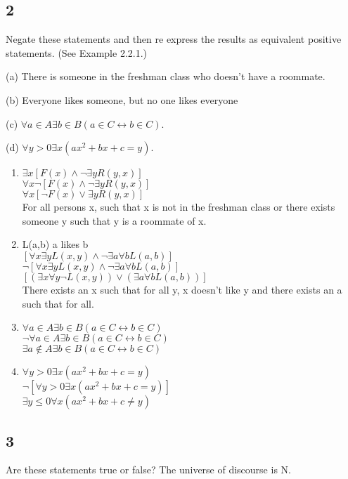 \documentclass{article}
\begin{document}
\subsection{2}
Negate these statements and then re express the results as equivalent
positive statements. (See Example 2.2.1.)

(a) There is someone in the freshman class who doesn't have a roommate.

(b) Everyone likes someone, but no one likes everyone

(c) $\forall a \in A  \exists b \in B(a \in C \leftrightarrow b \in C)$.

(d) $\forall y >  0 \exists x(ax^2 +bx +c = y)$.
\begin{enumerate}[label=(\alph*)]
    \item 
    $\exists x[F(x) \land \neg \exists y R(y,x)]$
    \\
    $\forall x \neg [F(x) \land \neg \exists y R(y,x)]$
    \\
    $\forall x[\neg F(x) \lor \exists y R(y,x)]$
    \\
    For all persons x, such that x is not in the freshman class or there exists someone y such that y is a roommate of x.
    \item
    L(a,b) a likes b
    \\
    $[\forall x \exists y L(x,y)\land \neg \exists a \forall b L(a,b)]$
    \\
    $\neg [\forall x \exists y L(x,y)\land \neg \exists a \forall b L(a,b)]$
    \\
    $[(\exists x \forall y \neg L(x,y))\lor (\exists a \forall b L(a,b))]$
    \\
    There exists an x such that for all y, x doesn't like y and there exists an a such that for all.
    \item
    $\forall a \in A  \exists b \in B(a \in C \leftrightarrow b \in C)$
    \\
    $\neg \forall a \in A  \exists b \in B(a \in C \leftrightarrow b \in C)$
    \\
    $\exists a \notin A  \exists b \in B(a \in C \leftrightarrow b \in C)$
    \item
    $\forall y >  0 \exists x(ax^2 +bx +c = y)$
    \\
    $\neg[\forall y >  0 \exists x(ax^2 +bx +c = y)]$
    \\
    $\exists y \leq 0 \forall x(ax^2 +bx +c \neq y)$
\end{enumerate}
\subsection{3}
Are these statements true or false? The universe of discourse is N.
\end{document}

